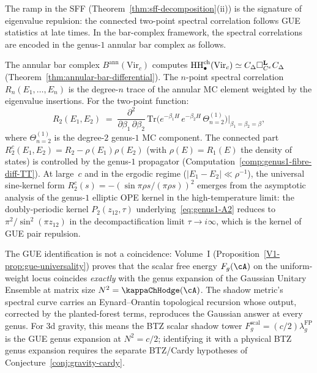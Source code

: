 \begin{remark}
\label{rem:rmt-bar-complex}%
%
%
The ramp in the SFF (Theorem~\ref{thm:sff-decomposition}(ii))
is the signature of eigenvalue repulsion: the connected two-point
spectral correlation follows GUE statistics at late times. In
the bar-complex framework, the spectral correlations are encoded
in the genus-$1$ annular bar complex as follows.

The annular bar complex $B^{\mathrm{ann}}(\mathrm{Vir}_c)$
computes $\operatorname{HH}_\bullet^{\mathrm{ch}}(\mathrm{Vir}_c)
\simeq C_\Delta \square_{C^e}^{\mathbf{L}} C_\Delta$
(Theorem~\ref{thm:annular-bar-differential}). The
$n$-point spectral correlation $R_n(E_1,\ldots,E_n)$ is
the degree-$n$ trace of the annular MC element weighted by
the eigenvalue insertions. For the two-point function:
\[
R_2(E_1, E_2)
\;=\;
\frac{\partial^2}{\partial \beta_1\,\partial\beta_2}\,
\mathrm{Tr}\bigl(
 e^{-\beta_1 H}\,e^{-\beta_2 H}\,
 \Theta^{(1)}_{n=2}
\bigr)\Big|_{\beta_1 = \beta_2 = \beta},
\]
where $\Theta^{(1)}_{n=2}$ is the degree-$2$ genus-$1$ MC
component. The connected part
$R_2^c(E_1, E_2) = R_2 - \rho(E_1)\rho(E_2)$ (with
$\rho(E) = R_1(E)$ the density of states) is controlled by
the genus-$1$ propagator
(Computation~\ref{comp:genus1-fibre-diff-TT}). At large~$c$
and in the ergodic regime ($|E_1 - E_2| \ll \rho^{-1}$),
the universal sine-kernel form
$R_2^c(s) = -(\sin\pi\rho s/(\pi\rho s))^2$ emerges from
the asymptotic analysis of the genus-$1$ elliptic OPE kernel
in the high-temperature limit: the doubly-periodic kernel
$P_2(z_{12},\tau)$ underlying~\eqref{eq:genus1-A2} reduces to
$\pi^2/\sin^2(\pi z_{12})$ in the decompactification limit
$\tau \to i\infty$, which is the kernel of GUE pair repulsion.

The GUE identification is not a coincidence: Volume~I
\textup{(}Proposition~\textup{\ref*{V1-prop:gue-universality})}
proves that the scalar free energy $F_g(\cA)$ on the
uniform-weight locus coincides \emph{exactly} with the genus
expansion of the Gaussian Unitary Ensemble at matrix size
$N^2 = \kappaChHodge(\cA)$. The shadow metric's spectral curve
carries an Eynard--Orantin topological recursion whose output,
corrected by the planted-forest terms, reproduces the Gaussian
answer at every genus. For 3d gravity, this means the BTZ
scalar shadow tower $F_g^{\mathrm{scal}} = (c/2)\lambda_g^{\mathrm{FP}}$
is the GUE genus expansion at $N^2 = c/2$; identifying it with a
physical BTZ genus expansion requires the separate
BTZ/Cardy hypotheses of Conjecture~\ref{conj:gravity-cardy}.


\end{remark}
